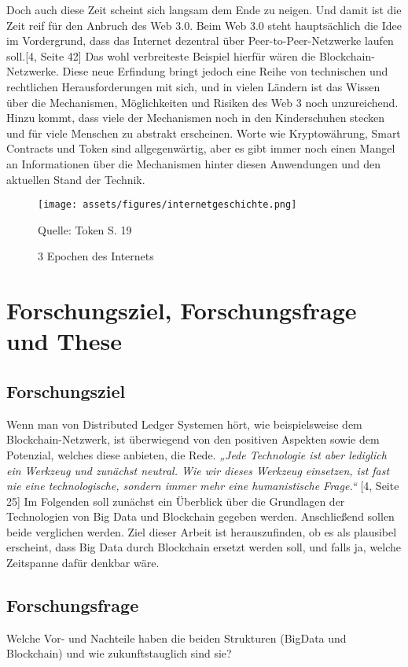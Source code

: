 Doch auch diese Zeit scheint sich langsam dem Ende zu neigen. Und damit ist die Zeit reif für den Anbruch des Web 3.0. Beim Web 3.0 steht hauptsächlich die Idee im Vordergrund, dass das Internet dezentral über Peer-to-Peer-Netzwerke laufen soll.[4, Seite 42] Das wohl verbreiteste Beispiel hierfür wären die Blockchain-Netzwerke. Diese neue Erfindung bringt jedoch eine Reihe von technischen und rechtlichen Herausforderungen mit sich, und in vielen Ländern ist das Wissen über die Mechanismen, Möglichkeiten und Risiken des Web 3 noch unzureichend. Hinzu kommt, dass viele der Mechanismen noch in den Kinderschuhen stecken und für viele Menschen zu abstrakt erscheinen. Worte wie Kryptowährung, Smart Contracts und Token sind allgegenwärtig, aber es gibt immer noch einen Mangel an Informationen über die Mechanismen hinter diesen Anwendungen und den aktuellen Stand der Technik.

\begin{figure}[!ht]
    \caption{3 Epochen des Internets}
    \texttt{[image: assets/figures/internetgeschichte.png]}
    \begin{flushleft}
        Quelle: Token S. 19
    \end{flushleft}
    \label{fig:birds}
\end{figure}

\section{Forschungsziel, Forschungsfrage und These}
\subsection{Forschungsziel}
Wenn man von Distributed Ledger Systemen hört, wie beispielsweise dem Blockchain-Netzwerk, ist überwiegend von den positiven Aspekten sowie dem Potenzial, welches diese anbieten, die Rede.
\textit{„Jede Technologie ist aber lediglich ein Werkzeug und zunächst neutral. Wie wir dieses Werkzeug einsetzen, ist fast nie eine technologische, sondern immer mehr eine humanistische Frage.“} [4, Seite 25]
Im Folgenden soll zunächst ein Überblick über die Grundlagen der Technologien von Big Data und Blockchain gegeben werden. Anschließend sollen beide verglichen werden.
Ziel dieser Arbeit ist herauszufinden, ob es als plausibel erscheint, dass Big Data durch Blockchain ersetzt werden soll, und falls ja, welche Zeitspanne dafür denkbar wäre.
\subsection{Forschungsfrage}
Welche Vor- und Nachteile haben die beiden Strukturen (BigData und Blockchain) und wie zukunftstauglich sind sie?
